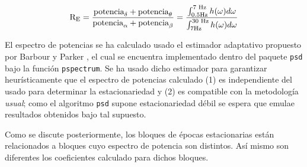 \begin{equation}
\text{R}_{\text{E}} = \frac{\text{potencia}_{\delta}+\text{potencia}_{\theta}}
{\text{potencia}_{\alpha}+\text{potencia}_{\beta}} =
\frac{\int_{\text 0.5 \si{\hertz}}^{\text{7 \si{\hertz}}}h(\omega) d\omega}
{\int_{\text 7 \si{\hertz}}^{\text{30 \si{\hertz}}}h(\omega) d\omega}
\label{enlentecimiento}
\end{equation}

El espectro de potencias se ha calculado usado el estimador adaptativo propuesto por
Barbour y Parker \cite{Barbour14}, el cual se encuentra implementado dentro del paquete
\texttt{psd} bajo la función \texttt{pspectrum}.
Se ha usado dicho estimador para garantizar heurísticamente que el espectro de potencias
calculado (1) es independiente del usado para determinar la estacionariedad y (2)
es compatible con la metodología \textit{usual}; como el algoritmo \texttt{psd} 
supone estacionariedad débil se espera que emulae resultados 
obtenidos bajo tal supuesto.

Como se discute posteriormente, los bloques de épocas estacionarias están relacionados a bloques
cuyo espectro de potencia son distintos. Así mismo son diferentes los coeficientes \lento calculado
para dichos bloques.

